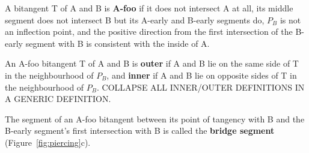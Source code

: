 \documentclass[12pt]{article}
\newif\ifCommentary             %
\newif\ifSurrounding            %
\begin{document}
\begin{defn2}
\label{defn:piercing1}
A bitangent T of A and B is {\bf A-foo} if 
it does not intersect A at all,
its middle segment does not intersect B but its A-early and B-early segments do,
$P_B$ is not an inflection point, 
and the positive direction 
from the first intersection of the B-early segment with B is 
consistent with the inside of A.
\end{defn2}

\ifCommentary
{\em Figure of A-consistent bitangent and not A-consistent bitangent, from bottom of p. 23 of Bellsouth workbook}
\fi

\begin{defn2}
An A-foo bitangent T of A and B is {\bf outer}
if A and B lie on the same side of T in the neighbourhood of $P_B$, and {\bf inner} 
if A and B lie on opposite sides of T in the neighbourhood of $P_B$.
COLLAPSE ALL INNER/OUTER DEFINITIONS IN A GENERIC DEFINITION.
\end{defn2}

\ifCommentary
{\em Figure of two curves and their A-foo bitangents, perhaps from 
Figure~\ref{fig:piercing}).}
\fi

\begin{defn2}
The segment of an A-foo bitangent between its point of tangency with B and 
the B-early segment's first intersection with B is called
the {\bf bridge segment} (Figure~\ref{fig:piercing}c).
\end{defn2}


\end{document}
